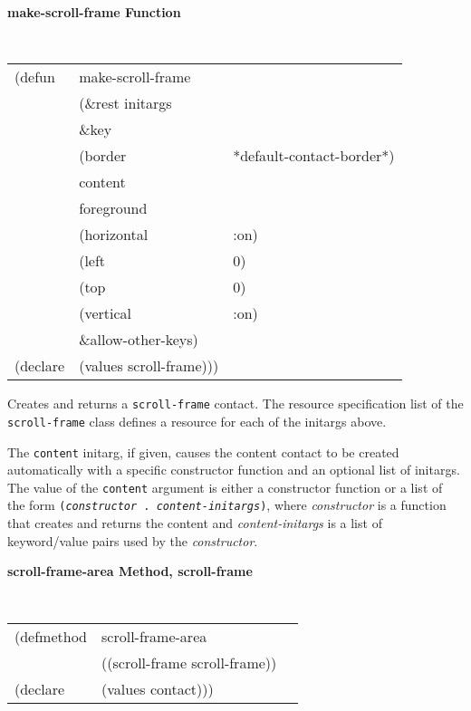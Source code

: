 {\samepage
{\large {\bf make-scroll-frame \hfill Function}} 
\begin{flushright} \parbox[t]{6.125in}{
\tt
\begin{tabular}{lll}
\raggedright
(defun & make-scroll-frame \\
       & (\&rest initargs \\
       & \&key  \\ 
       & (border                & *default-contact-border*) \\ 
       & content                &  \\ 
       & foreground \\
       & (horizontal    & :on)\\
       & (left          & 0)\\
       & (top           & 0)\\
       & (vertical      & :on) \\      
       & \&allow-other-keys) \\
(declare & (values   scroll-frame)))
\end{tabular}
\rm

}\end{flushright}}

\begin{flushright} \parbox[t]{6.125in}{
Creates and returns a {\tt scroll-frame} contact.
The resource specification list of the {\tt scroll-frame} class defines
a resource for each of the initargs above.

The {\tt content} initarg, if given, causes the content contact to be created
automatically with a specific constructor function and an optional list of
initargs. The value of the {\tt content} argument is
either a constructor function or a list of the form {\tt ({\em constructor} .
{\em content-initargs})}, where {\em constructor} is a function that creates and
returns the content and {\em content-initargs} is a list of keyword/value pairs
used by the {\em constructor}.

}\end{flushright}

{\samepage
{\large {\bf scroll-frame-area \hfill Method, scroll-frame}}
\begin{flushright} \parbox[t]{6.125in}{
\tt
\begin{tabular}{lll}
\raggedright
(defmethod & scroll-frame-area & \\
& ((scroll-frame  scroll-frame)) \\
(declare & (values contact)))
\end{tabular}
\rm

}\end{flushright}}

